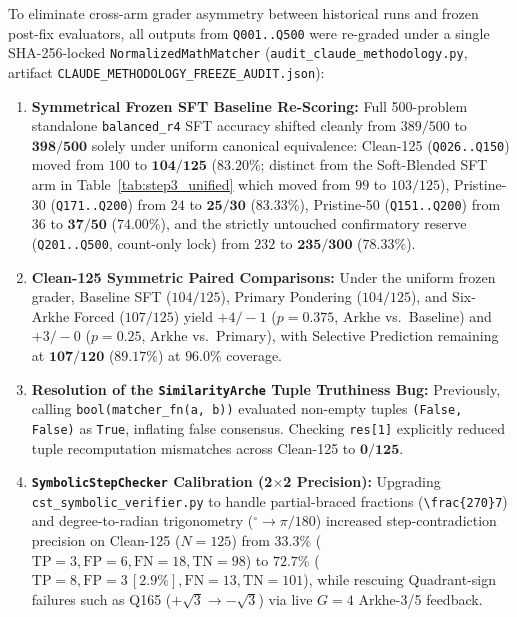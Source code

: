 \documentclass[11pt,a4paper]{article}
\begin{document}
To eliminate cross-arm grader asymmetry between historical runs and frozen post-fix evaluators, all outputs from \texttt{Q001..Q500} were re-graded under a single SHA-256-locked \texttt{NormalizedMathMatcher} (\texttt{audit\_claude\_methodology.py}, artifact \texttt{CLAUDE\_METHODOLOGY\_FREEZE\_AUDIT.json}):
\begin{enumerate}
    \item \textbf{Symmetrical Frozen SFT Baseline Re-Scoring:} Full 500-problem standalone \texttt{balanced\_r4} SFT accuracy shifted cleanly from $389/500$ to $\mathbf{398/500}$ solely under uniform canonical equivalence: Clean-125 (\texttt{Q026..Q150}) moved from $100$ to $\mathbf{104 / 125}$ ($83.20\%$; distinct from the Soft-Blended SFT arm in Table~\ref{tab:step3_unified} which moved from $99$ to $103/125$), Pristine-30 (\texttt{Q171..Q200}) from $24$ to $\mathbf{25 / 30}$ ($83.33\%$), Pristine-50 (\texttt{Q151..Q200}) from $36$ to $\mathbf{37 / 50}$ ($74.00\%$), and the strictly untouched confirmatory reserve (\texttt{Q201..Q500}, count-only lock) from $232$ to $\mathbf{235 / 300}$ ($78.33\%$).
    \item \textbf{Clean-125 Symmetric Paired Comparisons:} Under the uniform frozen grader, Baseline SFT ($104/125$), Primary Pondering ($104/125$), and Six-Arkhe Forced ($107/125$) yield $+4/-1$ ($p = 0.375$, Arkhe vs.\ Baseline) and $+3/-0$ ($p = 0.25$, Arkhe vs.\ Primary), with Selective Prediction remaining at $\mathbf{107/120}$ ($89.17\%$) at $96.0\%$ coverage.
    \item \textbf{Resolution of the \texttt{SimilarityArche} Tuple Truthiness Bug:} Previously, calling \texttt{bool(matcher\_fn(a, b))} evaluated non-empty tuples \texttt{(False, False)} as \texttt{True}, inflating false consensus. Checking \texttt{res[1]} explicitly reduced tuple recomputation mismatches across Clean-125 to $\mathbf{0 / 125}$.
    \item \textbf{\texttt{SymbolicStepChecker} Calibration (2$\times$2 Precision):} Upgrading \texttt{cst\_symbolic\_verifier.py} to handle partial-braced fractions (\texttt{\textbackslash frac\{270\}7}) and degree-to-radian trigonometry ($^\circ \to \pi/180$) increased step-contradiction precision on Clean-125 ($N=125$) from $33.3\%$ ($\text{TP}=3, \text{FP}=6, \text{FN}=18, \text{TN}=98$) to $\mathbf{72.7\%}$ ($\text{TP}=8, \text{FP}=3\,[2.9\%], \text{FN}=13, \text{TN}=101$), while rescuing Quadrant-sign failures such as Q165 ($+\sqrt{3} \to -\sqrt{3}$) via live $G=4$ Arkhe-3/5 feedback.
\end{enumerate}
\end{document}
